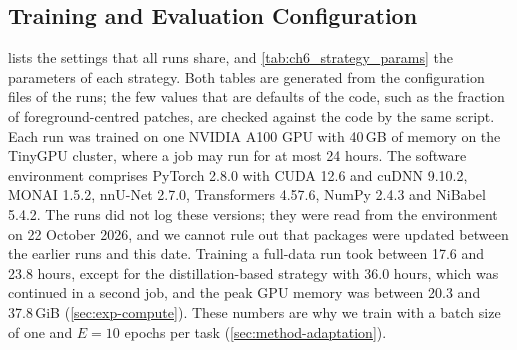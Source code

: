 \subsection{Training and Evaluation Configuration}
\label{subsec:exp-config}

 lists the settings that all runs share, and \cref{tab:ch6_strategy_params} the parameters of each strategy.
Both tables are generated from the configuration files of the runs; the few values that are defaults of the code, such as the fraction of foreground-centred patches, are checked against the code by the same script.
Each run was trained on one NVIDIA A100 GPU with 40\,GB of memory on the TinyGPU cluster, where a job may run for at most 24 hours.
The software environment comprises PyTorch 2.8.0 with CUDA 12.6 and cuDNN 9.10.2, MONAI 1.5.2, nnU-Net 2.7.0, Transformers 4.57.6, NumPy 2.4.3 and NiBabel 5.4.2.
The runs did not log these versions; they were read from the environment on 22 October 2026, and we cannot rule out that packages were updated between the earlier runs and this date.
Training a full-data run took between 17.6 and 23.8 hours, except for the distillation-based strategy with 36.0 hours, which was continued in a second job, and the peak GPU memory was between 20.3 and 37.8\,GiB (\cref{sec:exp-compute}).
These numbers are why we train with a batch size of one and $E = 10$ epochs per task (\cref{sec:method-adaptation}).

\begin{table}[tb]
\centering
\caption[Training and evaluation settings shared by all runs]{Training and evaluation settings shared by all runs (\cref{sec:method-adaptation}). Generated from the run configurations; code defaults checked against the code.}
\label{tab:ch6_hparams}

\end{table}

\begin{table}[tbp] %
\centering
\caption[Parameters of the strategies]{Parameters of the strategies (\cref{sec:method-strategies}). Sequential fine-tuning has no parameters of its own. Bold: rank used in the comparison of the strategies; scaling factor $\gamma_r = \alpha/\sqrt{r}$ listed per rank. The gradient scale of the prompt-tuning strategy was not active in the evaluated run (\cref{subsec:method-prompt}), and the weight ensemble of the distillation-based strategy was not evaluated (\cref{subsec:method-distillation}).}
\label{tab:ch6_strategy_params}

\end{table}

